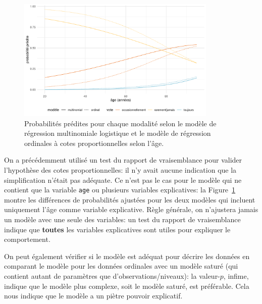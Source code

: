 \documentclass[
  11pt,
  letterpaper,
]{scrbook}
\theoremstyle{definition}
\theoremstyle{remark}
\begin{document}
\begin{figure}[ht!]

{\centering \includegraphics[width=0.85\textwidth,height=\textheight]{reglogistique_files/figure-pdf/fig-predmultinom-1.pdf}

}

\caption{\label{fig-predmultinom}Probabilités prédites pour chaque
modalité selon le modèle de régression multinomiale logistique et le
modèle de régression ordinales à cotes proportionnelles selon l'âge.}

\end{figure}

On a précédemment utilisé un test du rapport de vraisemblance pour
valider l'hypothèse des cotes proportionnelles: il n'y avait aucune
indication que la simplification n'était pas adéquate. Ce n'est pas le
cas pour le modèle qui ne contient que la variable \texttt{age} ou
plusieurs variables explicatives: la Figure~\ref{fig-predmultinom}
montre les différences de probabilités ajustées pour les deux modèles
qui incluent uniquement l'âge comme variable explicative. Règle
générale, on n'ajustera jamais un modèle avec une seule des variables:
un test du rapport de vraisemblance indique que \textbf{toutes} les
variables explicatives sont utiles pour expliquer le comportement.

On peut également vérifier si le modèle est adéquat pour décrire les
données en comparant le modèle pour les données ordinales avec un modèle
saturé (qui contient autant de paramètres que d'observations/niveaux):
la valeur-\(p\), infime, indique que le modèle plus complexe, soit le
modèle saturé, est préférable. Cela nous indique que le modèle a un
piètre pouvoir explicatif.
\end{document}
